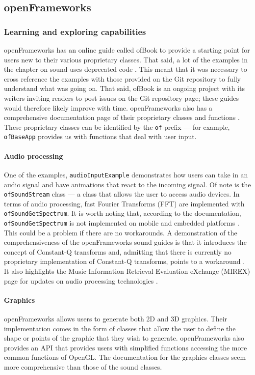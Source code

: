 \documentclass[../../initial_thesis.tex]{subfiles}
\begin{document}
\subsection{openFrameworks}\label{sec:openframeworks}

\subsubsection{Learning and exploring capabilities}
openFrameworks has an online guide called ofBook to provide a starting point for users new to their various proprietary classes. That said, a lot of the examples in the chapter on sound uses deprecated code \cite{Carlucci}. This meant that it was necessary to cross reference the examples with those provided on the Git repository to fully understand what was going on. That said, ofBook is an ongoing project with its writers inviting readers to post issues on the Git repository page; these guides would therefore likely improve with time. openFrameworks also has a comprehensive documentation page of their proprietary classes and functions \cite{openFrameworks}. These proprietary classes can be identified by the \verb|of| prefix --- for example, \verb|ofBaseApp| provides us with functions that deal with user input.

\paragraph{Audio processing}
One of the examples, \verb|audioInputExample| demonstrates how users can take in an audio signal and have animations that react to the incoming signal. Of note is the \verb|ofSoundStream| class --- a class that allows the user to access audio devices. In terms of audio processing, fast Fourier Transforms (FFT) are implemented with \verb|ofSoundGetSpectrum|. It is worth noting that, according to the documentation, \verb|ofSoundGetSpectrum| is not implemented on mobile and embedded platforms \cite{OFsoundstreamFFT}. This could be a problem if there are no workarounds. A demonstration of the comprehensiveness of the openFrameworks sound guides is that it introduces the concept of Constant-Q transforms and, admitting that there is currently no proprietary implementation of Constant-Q transforms, points to a workaround \cite{Klapuri}. It also highlights the Music Information Retrieval Evaluation eXchange (MIREX) page for updates on audio processing technologies \cite{mirexWiki}.

\paragraph{Graphics}
openFrameworks allows users to generate both 2D and 3D graphics. Their implementation comes in the form of classes that allow the user to define the shape or points of the graphic that they wish to generate. openFrameworks also provides an API that provides users with simplified functions accessing the more common functions of OpenGL. The documentation for the graphics classes seem more comprehensive than those of the sound classes.
\end{document}
